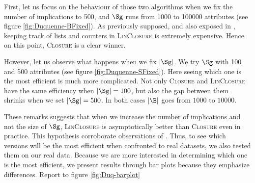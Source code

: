 \vspace{1.2em}

First, let us focus on the behaviour of those two algorithms when we fix the number of implications to 500, and $\Sg$ runs from 1000 to 100000 attributes (see figure \ref{fig:Duquenne-BFixed}). As previously supposed, and also exposed in \cite{bazhanov_optimizations_2014}, keeping track of lists and counters in \textsc{LinClosure} is extremely expensive. Hence on this point, \textsc{Closure} is a clear winner. 

\begin{figure}[H]
	
\end{figure}

However, let us observe what happens when we fix $|\Sg|$. We try $\Sg$ with 100 and 500 attributes (see figure \ref{fig:Duquenne-SFixed}). Here seeing which one
is the most efficient is much more complicated. Not only \textsc{Closure} and \textsc{LinClosure} have the same efficiency when $|\Sg| = 100$, but also the
gap between them shrinks when we set $|\Sg| = 500$. In both cases $|\B|$ goes
from $1000$ to $10000$.

\begin{figure}[H]
	
\end{figure}

These remarks suggests that when we increase the number of implications and not
the size of $\Sg$, \textsc{LinClosure} is asymptotically better than \textsc{Closure} even in practice. This hypothesis corroborate observations of 
\cite{bazhanov_optimizations_2014}. Thus, to see which versions will be the most
efficient when confronted to real datasets, we also tested them on our real data. Because we are more interested in determining which one is the most efficient, we present results through bar plots because they emphasize differences. Report to figure \ref{fig:Duq-barplot}

\begin{figure}[H]
	
\end{figure}

\vspace{1.2em}

